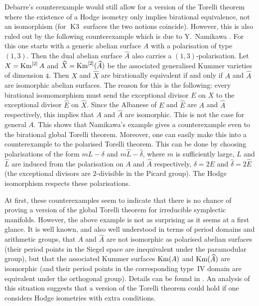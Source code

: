 \documentclass[a4paper,11pt]{article}
\renewcommand{\Hat}{\widehat}
\newcommand{\Km}{\mathop{\null\mathrm {Km}}\nolimits}
\newcommand{\Kthree}{\mathop{\mathrm {K3}}\nolimits}
\begin{document}
Debarre's counterexample would still allow for a version of the
Torelli theorem where the existence of a Hodge isometry only implies
birational equivalence, not an isomorphism (for $\Kthree$ surfaces the
two notions coincide). However, this is also ruled out by the
following counterexample which is due to Y.~Namikawa \cite{Nam}.  For
this one starts with a generic abelian surface $A$ with a polarisation
of type $(1,3)$.  Then the dual abelian surface $\Hat{A}$ also carries
a $(1,3)$-polarisation. Let $X=\Km^{[2]}A$ and $\Hat{X}=\Km^{[2]}(\Hat
A)$ be the associated generalised Kummer varieties of dimension
$4$. Then $X$ and $\Hat{X}$ are birationally equivalent if and only
if $A$ and $\Hat{A}$ are isomorphic abelian surfaces.  The reason for
this is the following: every birational isomomorphism must send the
exceptional divisor $E$ on $X$ to the exceptional divisor $\Hat{E}$ on
$\Hat{X}$. Since the Albanese of $E$ and $\Hat{E}$ are $A$ and
$\Hat{A}$ respectively, this implies that $A$ and $\Hat{A}$ are
isomorphic. This is not the case for general $A$.  This shows that
Namikawa's example gives a counterexample even to the birational
global Torelli theorem.  Moreover, one can easily make this into a
counterexample to the polarised Torelli theorem.  This can be done by
choosing polarisations of the form $mL- \delta$ and $m\Hat{L} -
\Hat{\delta}$, where $m$ is sufficiently large, $L$ and $\Hat{L}$ are
induced from the polarisation on $A$ and $\Hat{A}$ respectively,
$\delta=2E$ and $\Hat{\delta}=2\Hat{E}$ (the exceptional divisors are
$2$-divisible in the Picard group). The Hodge isomorphism respects
these polarisations.

At first, these counterexamples seem to indicate that there is no
chance of proving a version of the global Torelli theorem for
irreducible symplectic manifolds. However, the above example is not as
surprising as it seems at a first glance. It is well known, and also
well understood in terms of period domains and arithmetic groups, that
$A$ and $\Hat{A}$ are not isomorphic as polarised abelian surfaces
(their period points in the Siegel space are inequivalent under the
paramodular group), but that the associated Kummer surfaces $\Km(A)$
and $\Km(\Hat{A})$ are isomorphic (and their period points in the
corresponding type~IV domain are equivalent under the orthogonal
group). Details can be found in \cite{GH2}.  An analysis of this
situation suggests that a version of the Torelli theorem could hold if
one considers Hodge isometries with extra conditions.
\end{document}
